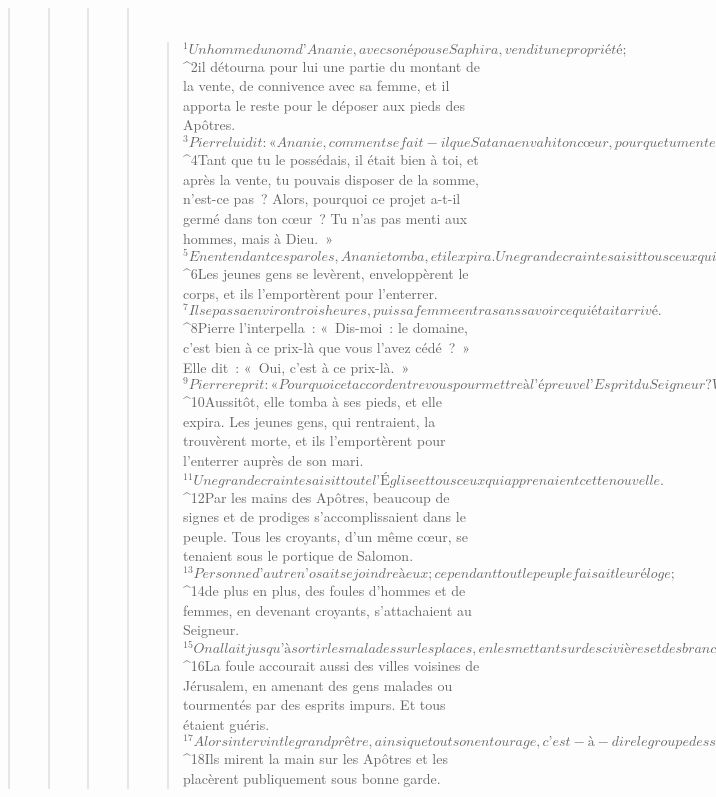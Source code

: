 \begin{verse}
\begin{verse}
\begin{verse}
\begin{verse}
         
      \bchapter{}
      \begin{verse}
${}^{1}Un homme du nom d’Ananie, avec son épouse Saphira, vendit une propriété ; 
${}^{2}il détourna pour lui une partie du montant de la vente, de connivence avec sa femme, et il apporta le reste pour le déposer aux pieds des Apôtres. 
${}^{3}Pierre lui dit : « Ananie, comment se fait-il que Satan a envahi ton cœur, pour que tu mentes à l’Esprit, l’Esprit Saint, et que tu détournes pour toi une partie du montant du domaine ? 
${}^{4}Tant que tu le possédais, il était bien à toi, et après la vente, tu pouvais disposer de la somme, n’est-ce pas ? Alors, pourquoi ce projet a-t-il germé dans ton cœur ? Tu n’as pas menti aux hommes, mais à Dieu. » 
${}^{5}En entendant ces paroles, Ananie tomba, et il expira. Une grande crainte saisit tous ceux qui apprenaient la nouvelle. 
${}^{6}Les jeunes gens se levèrent, enveloppèrent le corps, et ils l’emportèrent pour l’enterrer.
${}^{7}Il se passa environ trois heures, puis sa femme entra sans savoir ce qui était arrivé. 
${}^{8}Pierre l’interpella : « Dis-moi : le domaine, c’est bien à ce prix-là que vous l’avez cédé ? » Elle dit : « Oui, c’est à ce prix-là. » 
${}^{9}Pierre reprit : « Pourquoi cet accord entre vous pour mettre à l’épreuve l’Esprit du Seigneur ? Voici que sont à la porte les pas de ceux qui ont enterré ton mari ; ils vont t’emporter ! » 
${}^{10}Aussitôt, elle tomba à ses pieds, et elle expira. Les jeunes gens, qui rentraient, la trouvèrent morte, et ils l’emportèrent pour l’enterrer auprès de son mari. 
${}^{11}Une grande crainte saisit toute l’Église et tous ceux qui apprenaient cette nouvelle.
${}^{12}Par les mains des Apôtres, beaucoup de signes et de prodiges s’accomplissaient dans le peuple. Tous les croyants, d’un même cœur, se tenaient sous le portique de Salomon. 
${}^{13}Personne d’autre n’osait se joindre à eux ; cependant tout le peuple faisait leur éloge ; 
${}^{14}de plus en plus, des foules d’hommes et de femmes, en devenant croyants, s’attachaient au Seigneur. 
${}^{15}On allait jusqu’à sortir les malades sur les places, en les mettant sur des civières et des brancards : ainsi, au passage de Pierre, son ombre couvrirait l’un ou l’autre. 
${}^{16}La foule accourait aussi des villes voisines de Jérusalem, en amenant des gens malades ou tourmentés par des esprits impurs. Et tous étaient guéris.
${}^{17}Alors intervint le grand prêtre, ainsi que tout son entourage, c’est-à-dire le groupe des sadducéens, qui étaient remplis d’une ardeur jalouse pour la Loi. 
${}^{18}Ils mirent la main sur les Apôtres et les placèrent publiquement sous bonne garde. 

\end{verse}
\end{verse}
\end{verse}
\end{verse}
\end{verse}
